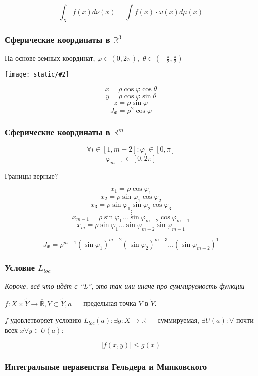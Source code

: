\documentclass{article}
\def\dbl{\,\,}
\def\images#1#2{\begin{center}\texttt{[image: static/\#2]}\end{center}}
\def\rinf{\overline{\mathbb{R}}}
\begin{document}
\[\int_{X}f(x)d\nu(x) = \int f(x) \cdot \omega(x) d\mu(x)\]

\subsubsection{Сферические координаты в $\mathbb{R}^3$}

На основе земных координат, $\varphi \in (0, 2\pi), \dbl \theta \in \left(-\frac{\pi}{2}, \frac{\pi}{2}\right)$

\images{0.3}{sph_3d.jpg}

\[x = \rho \cos \varphi \cos \theta\]
\[y = \rho \cos \varphi \sin \theta\]
\[z = \rho \sin \varphi\]
\[J_{\Phi} = \rho ^ 2 \cos \varphi\]

\subsubsection{Сферические координаты в $\mathbb{R}^m$}
\[\forall i \in [1, m - 2]: \varphi_i \in [0, \pi]\]
\[\varphi_{m - 1} \in [0, 2\pi]\]

Границы верные?

\[x_1 = \rho \cos \varphi_1\]
\[x_2 = \rho \sin \varphi_1 \cos \varphi_2\]
\[x_3 = \rho \sin \varphi_1 \sin \varphi_2 \cos \varphi_3\]
\[\vdots\]
\[x_{m - 1} = \rho \sin \varphi_1 \ldots \sin \varphi_{m - 2} \cos \varphi_{m - 1}\]
\[x_{m} = \rho \sin \varphi_1 \ldots \sin \varphi_{m - 2} \sin \varphi_{m - 1}\]

\[J_{\Phi} = \rho^{m - 1}(\sin \varphi_1)^{m - 2} (\sin \varphi_2)^{m - 3} \ldots (\sin \varphi_{m - 2})^{1}\]

\subsubsection{Условие $L_{loc}$}

\textit{Короче, всё что идёт с ``L'', это так или иначе про суммируемость функции}

$f: X \times \tilde{Y} \rightarrow \rinf, Y \subset \tilde{Y}, a$ --- предельная точка $Y$ в $\tilde{Y}$. 

$f$ удовлетворяет условию $L_{loc}(a): \exists g: X \rightarrow \rinf$ --- суммируемая, $\exists U(a): \forall$ почти всех $x \forall y \in U(a)$:

\[|f(x, y)| \le g(x)\]

\subsubsection{Интегральные неравенства Гельдера и Минковского}
\end{document}
